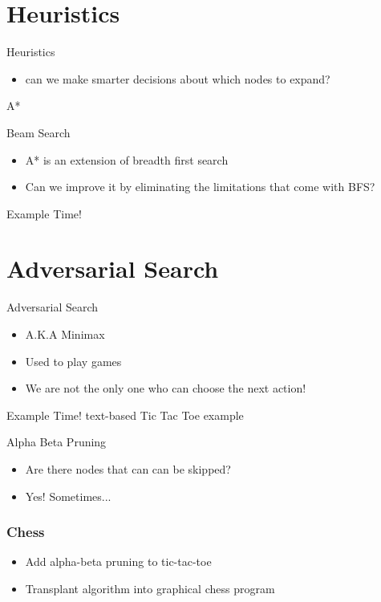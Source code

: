 \documentclass[presentation]{beamer}
\begin{document}
\section{Heuristics}
\begin{frame}{Heuristics}
  \begin{itemize}
  \item can we make smarter decisions about which nodes to expand?
  \end{itemize}
\end{frame}
\begin{frame}{A*}
\end{frame}
\begin{frame}{Beam Search}
  \begin{itemize}
  \item A* is an extension of breadth first search
  \item Can we improve it by eliminating the limitations that come
    with BFS?
  \end{itemize}
\end{frame}
\begin{frame}{Example Time!}
\end{frame}
\section{Adversarial Search}
\begin{frame}{Adversarial Search}
  \begin{itemize}
  \item A.K.A Minimax
  \item Used to play games
  \item We are not the only one who can choose the next action!
  \end{itemize}
\end{frame}
\begin{frame}{Example Time!}
  text-based Tic Tac Toe example
\end{frame}
\begin{frame}{Alpha Beta Pruning}
  \begin{itemize}
  \item Are there nodes that can can be skipped?
  \item<2-> Yes! Sometimes...
  \end{itemize}
\end{frame}
\begin{frame}
  \frametitle{Chess}
  \begin{itemize}
  \item Add alpha-beta pruning to tic-tac-toe
  \item Transplant algorithm into graphical chess program
  \end{itemize}
\end{frame}
\end{document}
